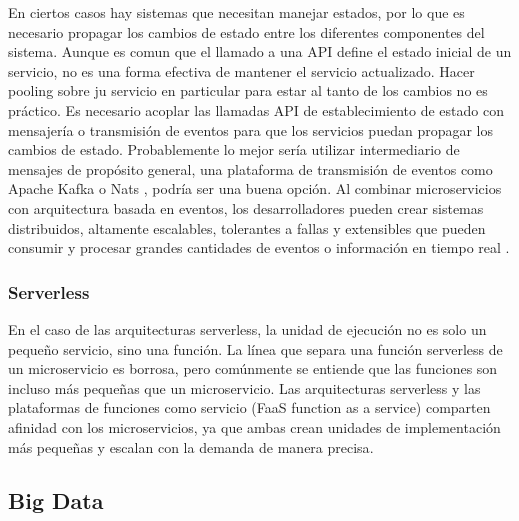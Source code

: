     En ciertos casos hay sistemas que necesitan manejar estados, por lo que es necesario propagar los cambios de estado entre los diferentes componentes del sistema. Aunque es comun que el llamado a una API define el estado inicial de un servicio, no es una forma efectiva de mantener el servicio actualizado. Hacer pooling sobre ju servicio en particular para estar al tanto de los cambios no es práctico. Es necesario acoplar las llamadas API de establecimiento de estado con mensajería o transmisión de eventos para que los servicios puedan propagar los cambios de estado. Probablemente lo mejor sería utilizar intermediario de mensajes de propósito general, una plataforma de transmisión de eventos como Apache Kafka \cite{BibEntry2022Apr} o Nats \cite{nats} \cite{micronats}, podría ser una buena opción. Al combinar microservicios con arquitectura basada en eventos, los desarrolladores pueden crear sistemas distribuidos, altamente escalables, tolerantes a fallas y extensibles que pueden consumir y procesar grandes cantidades de eventos o información en tiempo real \cite{ibmmicroservicios}.


\subsubsection{Serverless}

    En el caso de las arquitecturas serverless, la unidad de ejecución no es solo un pequeño servicio, sino una función. La línea que separa una función serverless de un microservicio es borrosa, pero comúnmente se entiende que las funciones son incluso más pequeñas que un microservicio.
    Las arquitecturas serverless y las plataformas de funciones como servicio (FaaS function as a service) comparten afinidad con los microservicios, ya que ambas crean unidades de implementación más pequeñas y escalan con la demanda de manera precisa\cite{ibmmicroservicios}.



\subsection{Big Data}

